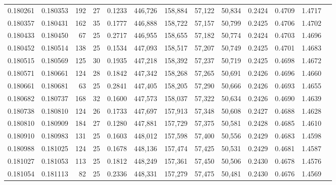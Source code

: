 \begin{tabular}{rrrrrrrrrrrrr}
0.180261 & 0.180353 & 192 &  27 &                                     0.1233 & 446,726 & 158,884 &  57,122 &  50,834 & 0.2424 & 0.4709 & 1.4717 \\
0.180357 & 0.180431 & 162 &  35 &                                     0.1777 & 446,888 & 158,722 &  57,157 &  50,799 & 0.2425 & 0.4706 & 1.4702 \\
0.180433 & 0.180450 &  67 &  25 &                                     0.2717 & 446,955 & 158,655 &  57,182 &  50,774 & 0.2424 & 0.4703 & 1.4696 \\
0.180452 & 0.180514 & 138 &  25 &                                     0.1534 & 447,093 & 158,517 &  57,207 &  50,749 & 0.2425 & 0.4701 & 1.4683 \\
0.180515 & 0.180569 & 125 &  30 &                                     0.1935 & 447,218 & 158,392 &  57,237 &  50,719 & 0.2425 & 0.4698 & 1.4672 \\
0.180571 & 0.180661 & 124 &  28 &                                     0.1842 & 447,342 & 158,268 &  57,265 &  50,691 & 0.2426 & 0.4696 & 1.4660 \\
0.180661 & 0.180681 &  63 &  25 &                                     0.2841 & 447,405 & 158,205 &  57,290 &  50,666 & 0.2426 & 0.4693 & 1.4655 \\
0.180682 & 0.180737 & 168 &  32 &                                     0.1600 & 447,573 & 158,037 &  57,322 &  50,634 & 0.2426 & 0.4690 & 1.4639 \\
0.180738 & 0.180810 & 124 &  26 &                                     0.1733 & 447,697 & 157,913 &  57,348 &  50,608 & 0.2427 & 0.4688 & 1.4628 \\
0.180810 & 0.180909 & 184 &  27 &                                     0.1280 & 447,881 & 157,729 &  57,375 &  50,581 & 0.2428 & 0.4685 & 1.4610 \\
0.180910 & 0.180983 & 131 &  25 &                                     0.1603 & 448,012 & 157,598 &  57,400 &  50,556 & 0.2429 & 0.4683 & 1.4598 \\
0.180988 & 0.181025 & 124 &  25 &                                     0.1678 & 448,136 & 157,474 &  57,425 &  50,531 & 0.2429 & 0.4681 & 1.4587 \\
0.181027 & 0.181053 & 113 &  25 &                                     0.1812 & 448,249 & 157,361 &  57,450 &  50,506 & 0.2430 & 0.4678 & 1.4576 \\
0.181054 & 0.181113 &  82 &  25 &                                     0.2336 & 448,331 & 157,279 &  57,475 &  50,481 & 0.2430 & 0.4676 & 1.4569 \\

\end{tabular}
